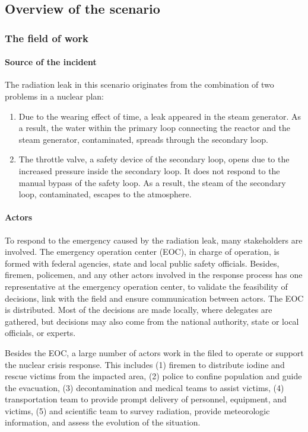 \subsection{Overview of the scenario} %
\label{sub:overview_of_the_scenario}
\subsubsection{The field of work} %
\label{ssub:overview_of_the_field_of_work}
\paragraph*{Source of the incident} %
\label{par:source_of_the_incident}
The radiation leak in this scenario originates from the combination of two problems in a nuclear plan:
\begin{enumerate}
	\item Due to the wearing effect of time, a leak appeared in the steam generator. As a result, the water within the primary loop connecting the reactor and the steam generator, contaminated, spreads through the secondary loop.
	\item The throttle valve, a safety device of the secondary loop, opens due to the increased pressure inside the secondary loop. It does not respond to the manual bypass of the safety loop. As a result, the steam of the secondary loop, contaminated, escapes to the atmosphere.
\end{enumerate}

\paragraph*{Actors} %
\label{par:actors}
To respond to the emergency caused by the radiation leak, many stakeholders are involved. The emergency operation center (EOC), in charge of operation, is formed with federal agencies, state and local public safety officials. Besides, firemen, policemen, and any other actors involved in the response process has one representative at the emergency operation center, to validate the feasibility of decisions, link with the field and ensure communication between actors. The EOC is distributed. Most of the decisions are made locally, where delegates are gathered, but decisions may also come from the national authority, state or local officials, or experts.

Besides the EOC, a large number of actors work in the filed to operate or support the nuclear crisis response. This includes (1) firemen to distribute iodine and rescue victims from the impacted area, (2) police to confine population and guide the evacuation, (3) decontamination and medical teams to assist victims, (4) transportation team to provide prompt delivery of personnel, equipment, and victims, (5) and scientific team to survey radiation, provide meteorologic information, and assess the evolution of the situation.


